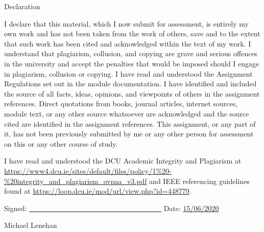 \thispagestyle{plain}
\begingroup
\renewcommand{\cleardoublepage}{}
\renewcommand{\clearpage}{}

\LARGE{Declaration}

\endgroup

\vskip 1cm

I declare that this material, which I now submit for assessment, is entirely my
own work and has not been taken from the work of others, save and to the extent
that such work has been cited and acknowledged within the text of my work. I
understand that plagiarism, collusion, and copying are grave and serious
offences in the university and accept the penalties that would be imposed should
I engage in plagiarism, collusion or copying. I have read and understood the
Assignment Regulations set out in the module documentation. I have identified
and included the source of all facts, ideas, opinions, and viewpoints of others
in the assignment references. Direct quotations from books, journal articles,
internet sources, module text, or any other source whatsoever are acknowledged
and the source cited are identified in the assignment references. This
assignment, or any part of it, has not been previously submitted by me or any
other person for assessment on this or any other course of study.

I have read and understood the DCU Academic Integrity and Plagiarism at
\url{https://www4.dcu.ie/sites/default/files/policy/1%20-%20integrity_and_plagiarism\_ovpaa_v3.pdf}
and IEEE referencing guidelines found at
\url{https://loop.dcu.ie/mod/url/view.php?id=448779}.

\vskip 1cm
Signed: \underline{\ \ \ \ \ \ \ \ \ \ \ \ \ \ \ \ \ \ \ \ \ \ \ \ \ \ \ \ \ \ \
\ \ \ \ \ \ } \hspace{20mm}Date: \underline{15/06/2020}

\hspace*{0mm}\phantom{Signed:}Michael Lenehan

\pagebreak
